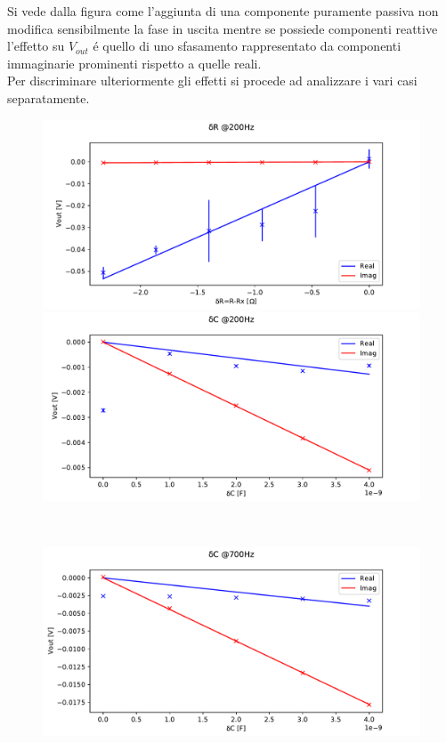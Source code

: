 Si vede dalla figura come l'aggiunta di una componente puramente passiva non modifica sensibilmente la fase in uscita mentre se possiede componenti reattive l'effetto su $V_{out}$ \'e quello di uno sfasamento rappresentato da componenti immaginarie prominenti rispetto a quelle reali.\\
Per discriminare ulteriormente gli effetti si procede ad analizzare i vari casi separatamente.
\begin{figure}[h]
    \centering
    \begin{minipage}{0.5\textwidth}
        \centering
        \includegraphics[width=\textwidth]{Figure_8.pdf} 
    \end{minipage}\hfill
    \begin{minipage}{0.5\textwidth}
        \centering
        \includegraphics[width=\textwidth]{Figure_9.pdf} 
    \end{minipage}
    \\
    \centering
    \begin{minipage}{0.5\textwidth}
        \centering
        \includegraphics[width=\textwidth]{Figure_10.pdf} 

\end{minipage}
\end{figure}
